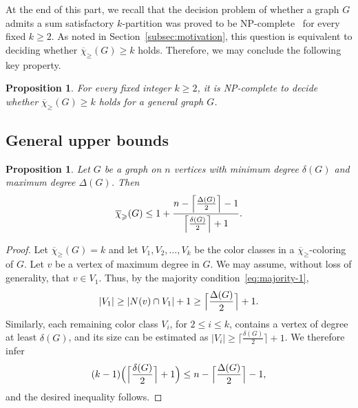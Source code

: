 \documentclass{article}
\newtheorem{proposition}[theorem]{Proposition}
\theoremstyle{definition}
\newcommand{\mc}{\overline{\chi}_{\geqslant}}
\newcommand{\cg}{{\rm C}_{\geqslant}}
\begin{document}


  At the end of this part, we recall that the decision problem of whether a graph $G$ admits a sum satisfactory $k$-partition was proved to be NP-complete~\cite{BTV-06} for every fixed $k\ge 2$. As noted in Section~\ref{subsec:motivation}, this question is equivalent to deciding whether $\mc(G) \ge k$ holds. Therefore, we may conclude the following key property.

 \begin{proposition} \label{prop:NP-c}
     For every fixed integer $k \ge 2$, it is NP-complete to decide whether $\mc(G) \ge k$ holds for a general graph $G$.
 \end{proposition}
 
\subsection{General upper bounds}
\begin{proposition} 
    Let $G$ be a graph on $n$ vertices with minimum degree $\delta(G)$ and maximum degree $\Delta(G)$. Then $$\mc(G) \leq 1+\frac{n - \Bigl\lceil \frac{\Delta(G)}{2}\Bigr\rceil -1}{\Bigl\lceil \frac{\delta(G)}{2}\Bigr\rceil +1}.$$
    \label{prop:upperboundDelta}
\end{proposition}
\begin{proof}
Let $\mc(G)=k$ %
  and let  $V_1,V_2,\ldots ,V_k$ be the color classes in a $\mc$-coloring of $G$. Let $v$ be a vertex of maximum degree in $G$. We may assume, without loss of generality, that  $v \in V_1$. Thus, by the majority condition~\eqref{eq:majority-1},
$$ |V_1| \ge |N(v) \cap V_1| +1 \ge \Bigl \lceil \frac{\Delta(G)}{2}\Bigr \rceil +1.
$$
Similarly, each remaining color class $V_i$, for $2 \le i \le k$, contains a vertex of degree at least $\delta(G)$, and its size can be estimated as  $|V_i| \ge \bigl\lceil \frac{\delta(G)}{2} \bigr\rceil +1$. We therefore infer 
$$(k-1)\Bigl(\Bigl \lceil \frac{\delta(G)}{2}\Bigr \rceil +1 \Bigr) \leq     n - \Bigl\lceil \frac{\Delta(G)}{2}\Bigr\rceil -1,$$ 
 and the desired inequality follows.  
\end{proof}
\end{document}
